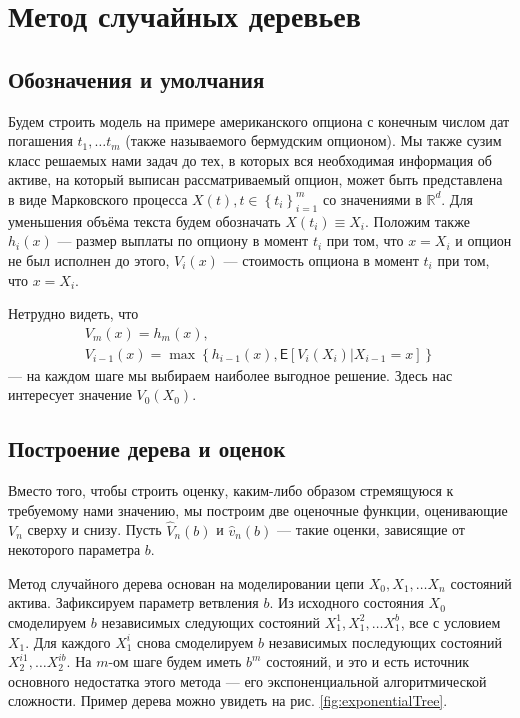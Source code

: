 \documentclass[specialist,
               substylefile = spbu.rtx,
               subf,href,colorlinks=true, 12pt]{disser}
\begin{document}
\chapter{Метод случайных деревьев}
	\section{Обозначения и умолчания}
	\par Будем строить модель на примере американского опциона с конечным числом дат погашения $t_1, \ldots t_m$ (также называемого бермудским опционом). Мы также сузим класс решаемых нами задач до тех, в которых вся необходимая информация об активе, на который выписан рассматриваемый опцион, может быть представлена в виде Марковского процесса $X\left( t \right), t \in \left\lbrace t_i \right\rbrace_{i = 1}^m$ со значениями в $\mathbb{R}^d$. Для уменьшения объёма текста будем обозначать $X\left(t_i\right) \equiv X_i$. Положим также $h_i\left(x\right)$ --- размер выплаты по опциону в момент $t_i$ при том, что $x = X_i$ и опцион не был исполнен до этого, $V_i\left(x\right)$ --- стоимость опциона в момент $t_i$ при том, что $x = X_i$.
	\par Нетрудно видеть, что
		\begin{eqnarray}\label{eq:option-recursive}
			V_m\left(x\right) = h_m\left(x\right), \\
			V_{i-1}\left(x\right) = \max\left\lbrace h_{i-1}\left(x\right), \mathsf{E}\left[V_i\left(X_i\right)|X_{i-1}=x\right]\right\rbrace
		\end{eqnarray}
	 --- на каждом шаге мы выбираем наиболее выгодное решение. Здесь нас интересует значение $V_0\left(X_0\right)$.
	\section{Построение дерева и оценок}
	\par Вместо того, чтобы строить оценку, каким-либо образом стремящуюся к требуемому нами значению, мы построим две оценочные функции, оценивающие $V_n$ сверху и снизу. Пусть $\hat{V}_n\left(b\right)$ и $\hat{v}_n\left(b\right)$ --- такие оценки, зависящие от некоторого параметра $b$.
	\par Метод случайного дерева основан на моделировании цепи $X_0, X_1, \ldots X_n$ состояний актива. Зафиксируем параметр ветвления $b$. Из исходного состояния $X_0$ смоделируем $b$ независимых следующих состояний $X_1^1, X_1^2, \ldots X_1^b$, все с условием $X_1$. Для каждого $X_1^i$ снова смоделируем $b$ независимых последующих состояний $X_2^{i1}, \ldots X_2^{ib}$. На $m$-ом шаге будем иметь $b^m$ состояний, и это и есть источник основного недостатка этого метода --- его экспоненциальной алгоритмической сложности. Пример дерева можно увидеть на рис. \ref{fig:exponentialTree}.
\end{document}
